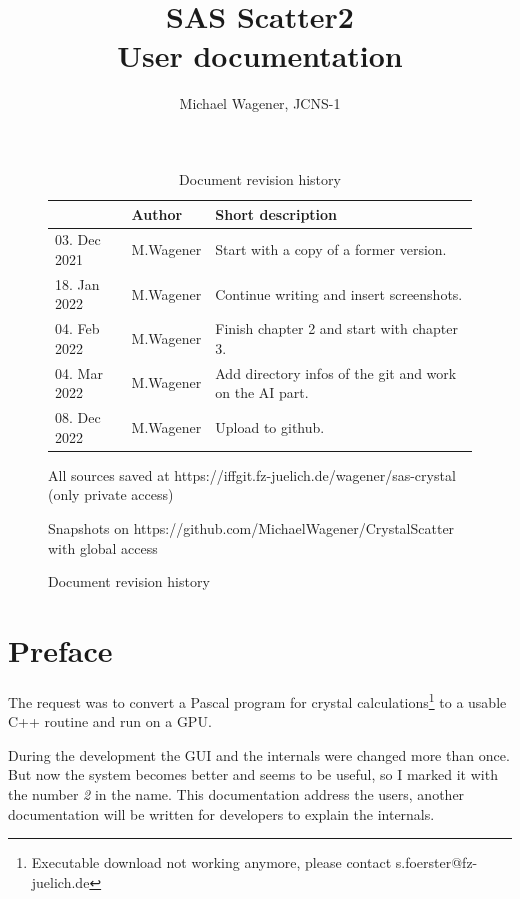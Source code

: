 \documentclass[11pt]{article} %
\author{Michael Wagener, JCNS-1}
\title{SAS Scatter2 \\[1ex] {\large User documentation}}
\begin{document}
\maketitle
\tableofcontents %

\begin{figure}[b] %
\begin{longtable}{|p{2.7cm}|p{2.6cm}|p{10.3cm}|}
\caption{Document revision history} \\
\hline\rowcolor{rowcolor}{\bf Date} & {\bf Author} & {\bf Short description} \\
\endfirsthead
\hline
03. Dec 2021 & M.Wagener & Start with a copy of a former version. \\ \hline
18. Jan 2022 & M.Wagener & Continue writing and insert screenshots. \\ \hline
04. Feb 2022 & M.Wagener & Finish chapter 2 and start with chapter 3. \\ \hline
04. Mar 2022 & M.Wagener & Add directory infos of the git and work on the AI part. \\ \hline
08. Dec 2022 & M.Wagener & Upload to github. \\ \hline
\end{longtable}

\centerline{All sources saved at https://iffgit.fz-juelich.de/wagener/sas-crystal (only private access)}
\centerline{Snapshots on https://github.com/MichaelWagener/CrystalScatter with global access}
\end{figure}

\clearpage %


\section{Preface}

The request was to convert a Pascal program for crystal calculations\footnote{Executable download not working anymore, please contact s.foerster@fz-juelich.de}
to a usable C++ routine and run on a GPU.

During the development the GUI and the internals were changed more than once. But now the system becomes better and seems to be useful, so I marked it with the number {\it 2} in the name. This documentation address the users, another documentation will be written for developers to explain the internals.
\end{document}
